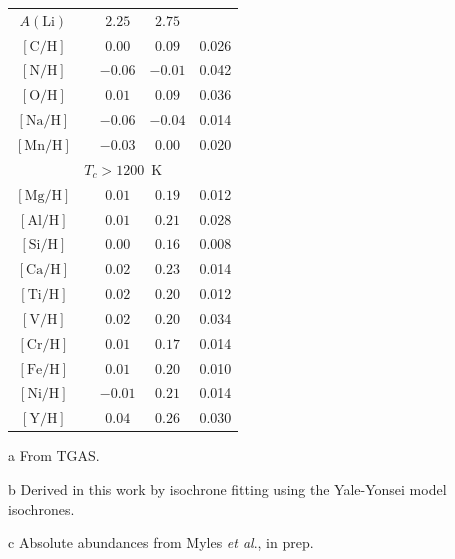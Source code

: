 \documentclass[12pt,letterpaper,margin=1in]{article}
\newcommand{\acronym}[1]{{\small{#1}}}
\newcommand{\tgas}{\acronym{TGAS}}
\newcommand{\etal}{\textit{et al}.}
\newcommand*\elem[1]{\ensuremath{\mathrm{#1}}}
\newcommand*\elemH[1]{\ensuremath{[\mathrm{#1}/\elem{H}]}}
\begin{document}
\begin{table}[htpb]
\begin{threeparttable}
\begin{tabular}{ccccc}
\hline 
$A(\elem{Li})$\tnote{c} &                & $2.25$                 & $2.75$                 &               \\
$\elemH{C}$             &                & $0.00$                 & $0.09$                 & 0.026         \\
$\elemH{N}$             &                & $-0.06$                & $-0.01$                & 0.042         \\
$\elemH{O}$             &                & $0.01$                 & $0.09$                 & 0.036         \\
$\elemH{Na}$            &                & $-0.06$                & $-0.04$                & 0.014         \\
$\elemH{Mn}$            &                & $-0.03$                & $0.00$                 & 0.020         \\
\hline 
\multicolumn{5}{c}{$T_c > 1200$~K} \\
\hline 
$\elemH{Mg}$            &                & $0.01$                 & $0.19$                 & 0.012         \\
$\elemH{Al}$            &                & $0.01$                 & $0.21$                 & 0.028         \\
$\elemH{Si}$            &                & $0.00$                 & $0.16$                 & 0.008         \\
$\elemH{Ca}$            &                & $0.02$                 & $0.23$                 & 0.014         \\
$\elemH{Ti}$            &                & $0.02$                 & $0.20$                 & 0.012         \\
$\elemH{V}$             &                & $0.02$                 & $0.20$                 & 0.034         \\
$\elemH{Cr}$            &                & $0.01$                 & $0.17$                 & 0.014         \\
$\elemH{Fe}$            &                & $0.01$                 & $0.20$                 & 0.010         \\
$\elemH{Ni}$            &                & $-0.01$                & $0.21$                 & 0.014         \\
$\elemH{Y}$             &                & $0.04$                 & $0.26$                 & 0.030         \\
\hline
\end{tabular}
\begin{tablenotes}
\item [a] From \tgas.
\item [b] Derived in this work by isochrone fitting using the Yale-Yonsei model
  isochrones\cite{2013ApJ...776...87S}.
\item [c] Absolute abundances from Myles \etal, in prep.
\end{tablenotes}
\end{threeparttable}
\end{table}
\end{document}
